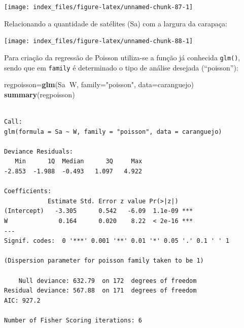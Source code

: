 \documentclass[12pt,brazil,oneside]{book}
\newenvironment{Shaded}{\begin{snugshade}}{\end{snugshade}}
\newcommand{\DataTypeTok}[1]{\textcolor[rgb]{0.13,0.29,0.53}{#1}}
\newcommand{\KeywordTok}[1]{\textcolor[rgb]{0.13,0.29,0.53}{\textbf{#1}}}
\newcommand{\NormalTok}[1]{#1}
\newcommand{\OperatorTok}[1]{\textcolor[rgb]{0.81,0.36,0.00}{\textbf{#1}}}
\newcommand{\StringTok}[1]{\textcolor[rgb]{0.31,0.60,0.02}{#1}}
\begin{document}
\begin{center}\texttt{[image: index\_files/figure-latex/unnamed-chunk-87-1]} \end{center}

Relacionando a quantidade de satélites (Sa) com a largura da carapaça:

\begin{Shaded}
\end{Shaded}

\begin{center}\texttt{[image: index\_files/figure-latex/unnamed-chunk-88-1]} \end{center}

Para criação da regressão de Poisson utiliza-se a função já conhecida
\texttt{glm()}, sendo que em \texttt{family} é determinado o tipo de
análise desejada (``poisson''):

\begin{Shaded}
\begin{Highlighting}[]
\NormalTok{regpoisson=}\KeywordTok{glm}\NormalTok{(Sa}\OperatorTok{~}\NormalTok{W, }\DataTypeTok{family=}\StringTok{"poisson"}\NormalTok{, }\DataTypeTok{data=}\NormalTok{caranguejo)}
\KeywordTok{summary}\NormalTok{(regpoisson)}
\end{Highlighting}
\end{Shaded}

\begin{verbatim}

Call:
glm(formula = Sa ~ W, family = "poisson", data = caranguejo)

Deviance Residuals: 
   Min      1Q  Median      3Q     Max  
-2.853  -1.988  -0.493   1.097   4.922  

Coefficients:
            Estimate Std. Error z value Pr(>|z|)    
(Intercept)   -3.305      0.542   -6.09  1.1e-09 ***
W              0.164      0.020    8.22  < 2e-16 ***
---
Signif. codes:  0 '***' 0.001 '**' 0.01 '*' 0.05 '.' 0.1 ' ' 1

(Dispersion parameter for poisson family taken to be 1)

    Null deviance: 632.79  on 172  degrees of freedom
Residual deviance: 567.88  on 171  degrees of freedom
AIC: 927.2

Number of Fisher Scoring iterations: 6
\end{verbatim}
\end{document}

